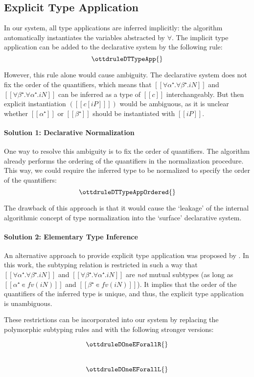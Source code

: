 \label{sec:extensions}


\subsection{Explicit Type Application}

In our system, all type applications are inferred implicitly: the algorithm
automatically instantiates the variables abstracted by $\forall$. 
The implicit type application can be added to the declarative system by the following rule:
$$\ottdruleDTTypeApp{}$$

However, this rule alone would cause ambiguity.
The declarative system does not fix the order of the quantifiers, 
which means that $[[∀α⁺.∀β⁺.iN]]$ and $[[∀β⁺.∀α⁺.iN]]$ can be inferred 
as a type of $[[c]]$ interchangeably. But then explicit instantiation
$([[ c[iP] ]])$ would be ambiguous, as it is unclear whether $[[α⁺]]$ or
$[[β⁺]]$ should be instantiated with $[[iP]]$.

\paragraph{Solution 1: Declarative Normalization}
One way to resolve this ambiguity is to fix the order of quantifiers.  
The algorithm already performs the ordering of the quantifiers in the normalization procedure.
This way, we could require the inferred type to be normalized
to specify the order of the quantifiers:
$$\ottdruleDTTypeAppOrdered{}$$

The drawback of this approach is that it 
would cause the `leakage' of the internal algorithmic 
concept of type normalization into the `surface' declarative 
system. 

\paragraph{Solution 2: Elementary Type Inference}
An alternative approach to provide explicit type application
 was proposed by \cite{zhao22:elementary}.
In this work, the subtyping relation is restricted 
in such a way that 
$[[∀α⁺.∀β⁺.iN]]$ and $[[∀β⁺.∀α⁺.iN]]$ are \emph{not} mutual subtypes 
(as long as $[[α⁺ ∊ fv(iN)]]$ and $[[β⁺ ∊ fv(iN)]]$).
It implies that the order of the quantifiers of the inferred type is unique,
and thus, the explicit type application is unambiguous.

These restrictions can be incorporated into our system by
replacing the polymorphic subtyping rules
 and 
with the following stronger versions:
\vspace{-\baselineskip}
\begin{multicols}{2}
$$ \ottdruleDOneEForallR{} $$\\
$$ \ottdruleDOneEForallL{} $$
\end{multicols}

